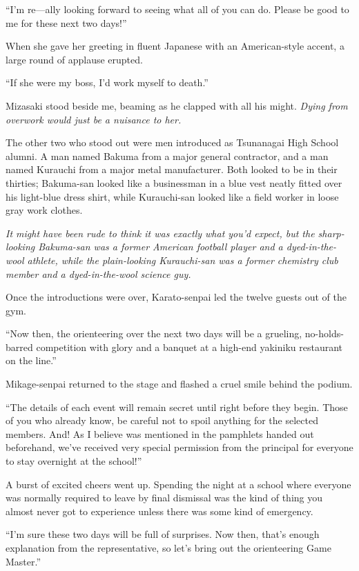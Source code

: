 \documentclass[
    a4paper,
    12pt,
    twoside,
    openany,
    UTF8,
    fontset=windows
]{ctexbook}
\begin{document}
``I'm re---ally looking forward to seeing what all of you can do. Please be good to me for these next two days!''

When she gave her greeting in fluent Japanese with an American-style accent, a large round of applause erupted.

``If she were my boss, I'd work myself to death.''

Mizasaki stood beside me, beaming as he clapped with all his might. \textit{Dying from overwork would just be a nuisance to her.}

The other two who stood out were men introduced as Tsunanagai High School alumni. A man named Bakuma from a major general contractor, and a man named Kurauchi from a major metal manufacturer. Both looked to be in their thirties; Bakuma-san looked like a businessman in a blue vest neatly fitted over his light-blue dress shirt, while Kurauchi-san looked like a field worker in loose gray work clothes.

\textit{It might have been rude to think it was exactly what you'd expect, but the sharp-looking Bakuma-san was a former American football player and a dyed-in-the-wool athlete, while the plain-looking Kurauchi-san was a former chemistry club member and a dyed-in-the-wool science guy.}

Once the introductions were over, Karato-senpai led the twelve guests out of the gym.

``Now then, the orienteering over the next two days will be a grueling, no-holds-barred competition with glory and a banquet at a high-end yakiniku restaurant on the line.''

Mikage-senpai returned to the stage and flashed a cruel smile behind the podium.

``The details of each event will remain secret until right before they begin. Those of you who already know, be careful not to spoil anything for the selected members. And! As I believe was mentioned in the pamphlets handed out beforehand, we've received very special permission from the principal for everyone to stay overnight at the school!''

A burst of excited cheers went up. Spending the night at a school where everyone was normally required to leave by final dismissal was the kind of thing you almost never got to experience unless there was some kind of emergency.

``I'm sure these two days will be full of surprises. Now then, that's enough explanation from the representative, so let's bring out the orienteering Game Master.''
\end{document}
